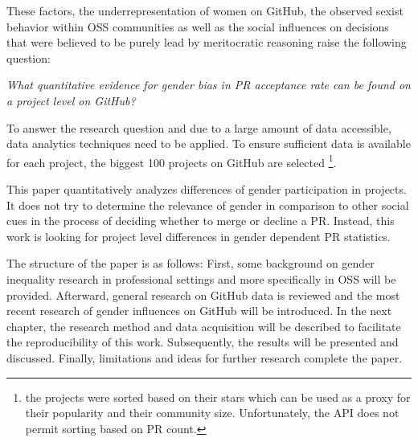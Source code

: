 These factors, the underrepresentation of women on GitHub, the observed sexist behavior within \ac{OSS} communities as well as the social influences on decisions that were believed to be purely lead by meritocratic reasoning raise the following question:%

\emph{What quantitative evidence for gender bias in \ac{PR} acceptance rate can be found on a project level on GitHub?}




To answer the research question and due to a large amount of data accessible, data analytics techniques need to be applied. To ensure sufficient data is available for each project, the biggest 100 projects on GitHub are selected
\footnote{the projects were sorted based on their stars which can be used as a proxy for their popularity and their community size. Unfortunately, the \ac{API} does not permit sorting based on \ac{PR} count.}.

This paper quantitatively analyzes differences of gender participation in projects. It does not try to determine the relevance of gender in comparison to other social cues in the process of deciding whether to merge or decline a \ac{PR}. Instead, this work is looking for project level differences in gender dependent \ac{PR} statistics. %

The structure of the paper is as follows: First, some background on gender inequality research in professional settings and more specifically in \ac{OSS} will be provided. Afterward, general research on GitHub data is reviewed and the most recent research of gender influences on GitHub will be introduced. In the next chapter, the research method and data acquisition will be described to facilitate the reproducibility of this work. Subsequently, the results will be presented and discussed. Finally, limitations and ideas for further research complete the paper.

